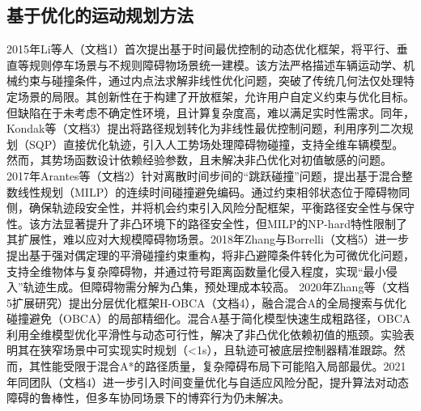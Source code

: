 \documentclass[master,academic]{ysuthesis} %
\begin{document}
		\subsection{基于优化的运动规划方法}
		2015年Li等人（文档1）首次提出基于时间最优控制的动态优化框架，将平行、垂直等规则停车场景与不规则障碍物场景统一建模。该方法严格描述车辆运动学、机械约束与碰撞条件，通过内点法求解非线性优化问题，突破了传统几何法仅处理特定场景的局限。其创新性在于构建了开放框架，允许用户自定义约束与优化目标。但缺陷在于未考虑不确定性环境，且计算复杂度高，难以满足实时性需求。同年，Kondak等（文档3）提出将路径规划转化为非线性最优控制问题，利用序列二次规划（SQP）直接优化轨迹，引入人工势场处理障碍物碰撞，支持全维车辆模型。然而，其势场函数设计依赖经验参数，且未解决非凸优化对初值敏感的问题。 
		2017年Arantes等（文档2）针对离散时间步间的“跳跃碰撞”问题，提出基于混合整数线性规划（MILP）的连续时间碰撞避免编码。通过约束相邻状态位于障碍物同侧，确保轨迹段安全性，并将机会约束引入风险分配框架，平衡路径安全性与保守性。该方法显著提升了非凸环境下的路径安全性，但MILP的NP-hard特性限制了其扩展性，难以应对大规模障碍物场景。2018年Zhang与Borrelli（文档5）进一步提出基于强对偶定理的平滑碰撞约束重构，将非凸避障条件转化为可微优化问题，支持全维物体与复杂障碍物，并通过符号距离函数量化侵入程度，实现“最小侵入”轨迹生成。但障碍物需分解为凸集，预处理成本较高。
		2020年Zhang等（文档5扩展研究）提出分层优化框架H-OBCA（文档4），融合混合A的全局搜索与优化碰撞避免（OBCA）的局部精细化。混合A基于简化模型快速生成粗路径，OBCA利用全维模型优化平滑性与动态可行性，解决了非凸优化依赖初值的瓶颈。实验表明其在狭窄场景中可实现实时规划（<1s），且轨迹可被底层控制器精准跟踪。然而，其性能受限于混合A*的路径质量，复杂障碍布局下可能陷入局部最优。2021年同团队（文档4）进一步引入时间变量优化与自适应风险分配，提升算法对动态障碍的鲁棒性，但多车协同场景下的博弈行为仍未解决。
\end{document}
